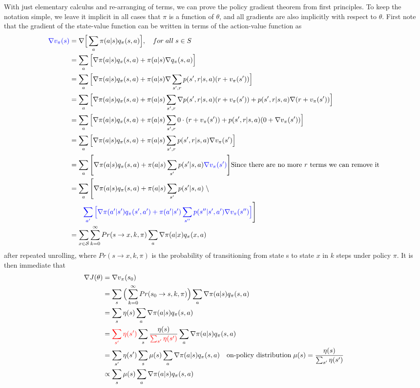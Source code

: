 {\begin{tcolorbox}[
    enhanced, 
    breakable,
    skin first=enhanced,
    skin middle=enhanced,
    skin last=enhanced,
    colbacktitle=black!7!white,
    coltitle=black!75!white,
    title=\textbf{Proof of the Policy Gradient Theorem (episodic case)}
    ]
With just elementary calculus and re-arranging of terms, we can prove the policy gradient theorem from first principles. To keep the notation simple, we leave it implicit in all cases that $\pi$ is a function of $\theta$, and all gradients are also implicitly with respect to $\theta$. First note that the gradient of the state-value function can be written in terms of the action-value function as
\begin{align*}
    \textcolor{blue}{\nabla v_\pi(s)}&=\nabla\Big[\sum_a\pi(a|s)q_\pi(s,a)\Big],\quad for\;all\;s\in S\\
    &=\sum_a\Big[\nabla\pi(a|s)q_\pi(s,a)+\pi(a|s)\nabla q_\pi(s,a)\Big]\\
    &=\sum_a\Big[\nabla\pi(a|s)q_\pi(s,a)+\pi(a|s)\nabla\sum_{s',r}p(s',r|s,a)(r+v_\pi(s')) \Big]\\
    &=\sum_a\Big[\nabla\pi(a|s)q_\pi(s,a)+\pi(a|s)\sum_{s',r}\nabla p(s',r|s,a)(r+v_\pi(s'))+p(s',r|s,a)\nabla(r+v_\pi(s')) \Big]\\
    &=\sum_a\Big[\nabla\pi(a|s)q_\pi(s,a)+\pi(a|s)\sum_{s',r}0\cdot(r+v_\pi(s'))+p(s',r|s,a)(0+\nabla v_\pi(s')) \Big]\\
    &=\sum_a\Big[\nabla\pi(a|s)q_\pi(s,a)+\pi(a|s)\sum_{s',r}p(s',r|s,a)\nabla v_\pi(s') \Big]\\
    &=\sum_a\Bigg[\nabla\pi(a|s)q_\pi(s,a)+\pi(a|s)\sum_{s'}p(s'|s,a)\textcolor{blue}{\nabla v_\pi(s')} \Bigg] \text{Since there are no more $r$ terms  we can remove it}\\
    &=\sum_a\Bigg[\nabla\pi(a|s)q_\pi(s,a)+\pi(a|s)\sum_{s'}p(s'|s,a) \;\backslash \\
    &\quad\quad\textcolor{blue}{\sum_{a'}\Big[\nabla\pi(a'|s')q_\pi(s',a')+\pi(a'|s')\sum_{s''}p(s''|s',a')\nabla v_\pi(s'')\Big]}\Bigg]\\
    &=\sum_{x\in\mathcal{S}}\sum_{k=0}^{\infty} Pr(s\rightarrow x, k, \pi)\sum_a\nabla\pi(a|x)q_\pi(x,a)
\end{align*}
after repeated unrolling, where $Pr(s\rightarrow x, k, \pi)$ is the probability of transitioning
from state s to state $x$ in $k$ steps under policy $\pi$. It is then immediate that
\begin{align*}
    \nabla J(\theta)&=\nabla v_\pi(s_0)\\
    &=\sum_{s}\Big(\sum_{k=0}^{\infty} Pr(s_0\rightarrow s, k, \pi)\Big)\sum_a\nabla\pi(a|s)q_\pi(s,a)\\
    &=\sum_{s}\eta(s)\sum_a\nabla\pi(a|s)q_\pi(s,a)\\
    &=\textcolor{red}{\sum_{s'}\eta(s')}\sum_{s}\frac{\eta(s)}{\textcolor{red}{\sum_{s'}\eta(s')}}\sum_a\nabla\pi(a|s)q_\pi(s,a)\\
    &=\sum_{s'}\eta(s')\sum_{s}\mu(s)\sum_a\nabla\pi(a|s)q_\pi(s,a)\quad\text{on-policy distribution}\; \mu(s)=\frac{\eta(s)}{\sum_{s'}\eta(s')}\\
    &\propto\sum_{s}\mu(s)\sum_a\nabla\pi(a|s)q_\pi(s,a)
\end{align*}


\end{tcolorbox}}
